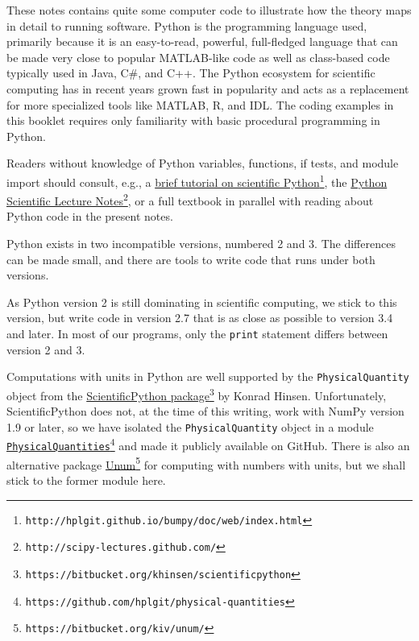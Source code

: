 \documentclass[graybox,envcountchap,sectrefs,final]{svmonodo}
\newenvironment{warning_mdfboxadmon}[1][]{
\begin{warning_mdfboxmdframed}[frametitle=#1]
}
{
\end{warning_mdfboxmdframed}
}
\begin{document}
These notes contains quite some computer code to illustrate how the theory
maps in detail to running software. Python is the programming language
used, primarily because it is an easy-to-read, powerful,
full-fledged language that can be made very close to popular MATLAB-like code
as well as class-based code typically used in Java, C\#, and C++.
The Python ecosystem for scientific computing has in recent years grown
fast in popularity and acts as a replacement for more specialized tools
like MATLAB, R, and IDL.
The coding examples in this booklet requires only familiarity with basic
procedural programming in Python.

Readers without knowledge of Python variables, functions, if tests,
and module import should consult, e.g., a \href{{http://hplgit.github.io/bumpy/doc/web/index.html}}{brief tutorial on scientific
Python}\footnote{\texttt{http://hplgit.github.io/bumpy/doc/web/index.html}},
the \href{{http://scipy-lectures.github.com/}}{Python Scientific Lecture Notes}\footnote{\texttt{http://scipy-lectures.github.com/}},
or a full textbook \cite{Langtangen_2012} in parallel with reading about
Python code in the present notes.


\begin{warning_mdfboxadmon}
Python exists in two incompatible versions, numbered 2 and 3.
The differences can be made small, and there are tools to write
code that runs under both versions.

As Python version 2 is still dominating
in scientific computing, we stick to this version, but
write code in version 2.7 that is as close as possible to version 3.4
and later. In most of our programs, only the \texttt{print} statement differs
between version 2 and 3.
\end{warning_mdfboxadmon}




Computations with units in Python are well supported by the
\texttt{PhysicalQuantity} object from the \href{{https://bitbucket.org/khinsen/scientificpython}}{ScientificPython package}\footnote{\texttt{https://bitbucket.org/khinsen/scientificpython}} by Konrad
Hinsen. Unfortunately, ScientificPython does not, at the time of this
writing, work with NumPy version 1.9 or later, so we have isolated the
\texttt{PhysicalQuantity} object in a module \href{{https://github.com/hplgit/physical-quantities}}{\nolinkurl{PhysicalQuantities}\footnote{\texttt{https://github.com/hplgit/physical-quantities}}} and made it publicly
available on GitHub. There is also an alternative package \href{{https://bitbucket.org/kiv/unum/}}{Unum}\footnote{\texttt{https://bitbucket.org/kiv/unum/}} for computing with numbers with
units, but we shall stick to the former module here.
\end{document}
